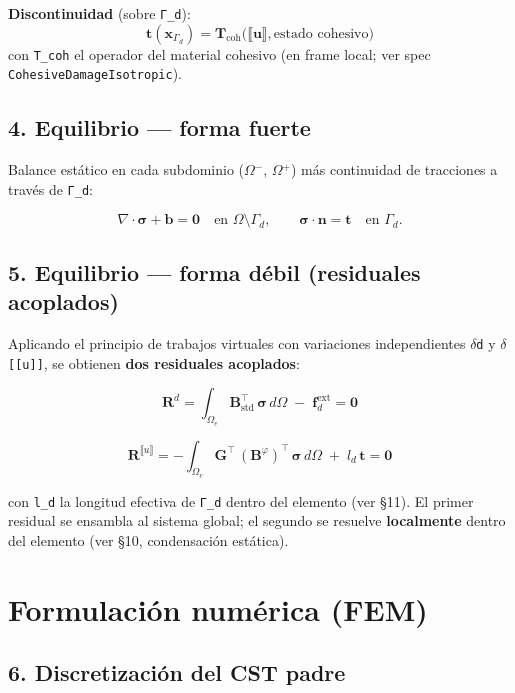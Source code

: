 \documentclass[11pt,letterpaper,oneside]{report}
\begin{document}
\textbf{Discontinuidad} (sobre \texttt{Γ\_d}):
\[
\mathbf t(\mathbf x_{\Gamma_d}) = \mathbf T_{\text{coh}}\bigl(\llbracket\mathbf u\rrbracket, \text{estado cohesivo}\bigr)
\]
con \texttt{T\_coh} el operador del material cohesivo (en frame local; ver spec \texttt{CohesiveDamageIsotropic}).

\subsection{4. Equilibrio --- forma fuerte}

Balance estático en cada subdominio (\texttt{\ensuremath{\Omega}\ensuremath{^{-}}}, \texttt{\ensuremath{\Omega}\ensuremath{^{+}}}) más continuidad de tracciones a través de \texttt{Γ\_d}:

\[
\nabla\cdot\boldsymbol\sigma + \mathbf b = \mathbf 0 \quad \text{en } \Omega \setminus \Gamma_d, \qquad \boldsymbol\sigma\cdot\mathbf n = \mathbf t \quad \text{en } \Gamma_d.
\]

\subsection{5. Equilibrio --- forma débil (residuales acoplados)}

Aplicando el principio de trabajos virtuales con variaciones independientes \texttt{\ensuremath{\delta}d} y \texttt{\ensuremath{\delta}[[u]]}, se obtienen \textbf{dos residuales acoplados}:

\[
\mathbf R^d = \int_{\Omega_e} \mathbf B_{\text{std}}^\top\,\boldsymbol\sigma\,d\Omega \;-\; \mathbf f^{\text{ext}}_d = \mathbf 0
\]

\[
\mathbf R^{\llbracket u\rrbracket} = -\int_{\Omega_e} \mathbf G^\top\,(\mathbf B^\varphi)^\top\,\boldsymbol\sigma\,d\Omega \;+\; l_d\,\mathbf t = \mathbf 0
\]

con \texttt{l\_d} la longitud efectiva de \texttt{Γ\_d} dentro del elemento (ver §11). El primer residual se ensambla al sistema global; el segundo se resuelve \textbf{localmente} dentro del elemento (ver §10, condensación estática).


\section{Formulación numérica (FEM)}

\subsection{6. Discretización del CST padre}
\end{document}
